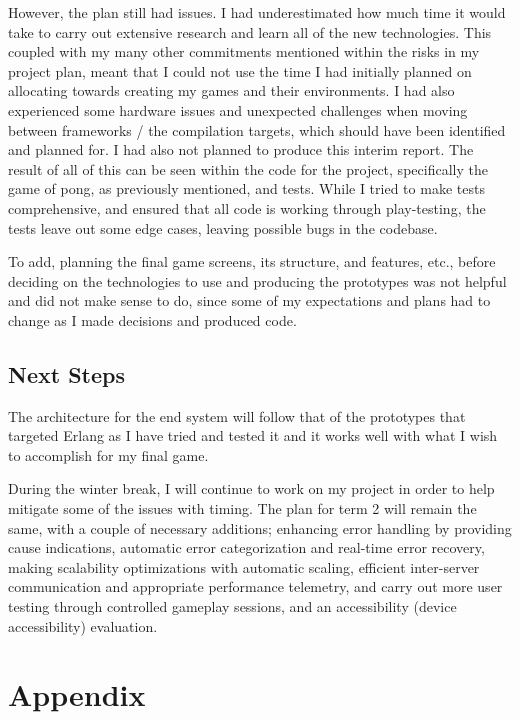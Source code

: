 \documentclass[]{interim}
\begin{document}
However, the plan still had issues. I had underestimated how much time it would
take to carry out extensive research and learn all of the new technologies. This
coupled with my many other commitments mentioned within the risks in my project plan,
meant that I could not use the time I had initially planned on allocating towards
creating my games and their environments. I had also experienced some hardware
issues and unexpected challenges when moving between frameworks / the compilation
targets, which should have been identified and planned for. I had also not planned to
produce this interim report. The result of all of this can be seen within the
code for the project, specifically the game of pong, as previously mentioned, and tests. While I tried to make tests comprehensive,
and ensured that all code is working through play-testing, the tests leave out
some edge cases, leaving possible bugs in the codebase.

To add, planning the final game screens, its structure, and features, etc., before
deciding on the technologies to use and producing the prototypes was not helpful and
did not make sense to do, since some of my expectations and plans had to change as I
made decisions and produced code.

\section{Next Steps}

The architecture for the end system will follow that of the prototypes that
targeted Erlang as I have tried and tested it and it works well with what I
wish to accomplish for my final game.

During the winter break, I will continue to work on my project in order to help
mitigate some of the issues with timing. The plan for term 2 will remain the same,
with a couple of necessary additions; enhancing error handling by providing
cause indications, automatic error categorization and real-time error recovery,
making scalability optimizations with automatic scaling, efficient
inter-server communication and appropriate performance telemetry, and carry
out more user testing through controlled gameplay sessions, and an
accessibility (device accessibility) evaluation.

\newpage
{}


\chapter{Appendix}
\end{document}
